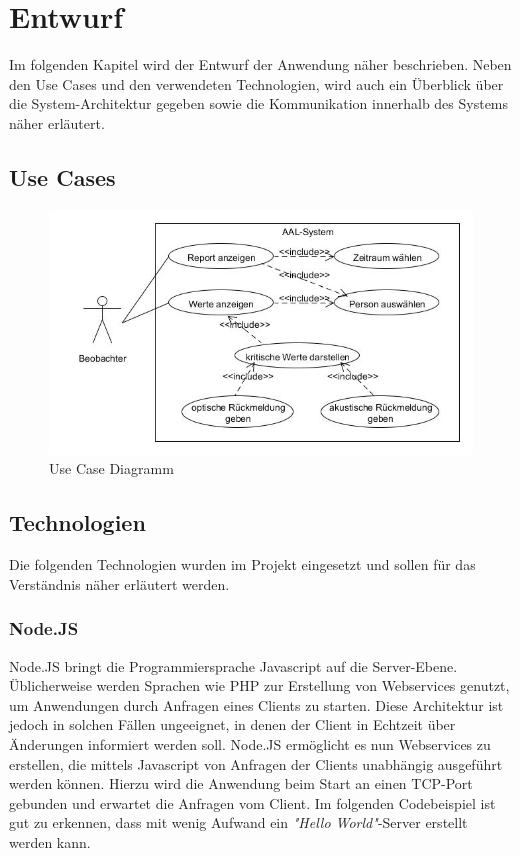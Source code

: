 \section{Entwurf}
\label{sec:Entwurf}
Im folgenden Kapitel wird der Entwurf der Anwendung näher beschrieben. Neben den Use Cases und den verwendeten Technologien, wird auch ein Überblick über die System-Architektur gegeben sowie die Kommunikation innerhalb des Systems näher erläutert.

\subsection{Use Cases}
\label{subsec:UseCases}
\begin{figure}[h]
\begin{center}
\includegraphics[scale=0.7]{images/AAL-Use-Case-Diagramm.jpg} 
\caption{Use Case Diagramm}
\label{fig:UseCaseDiagramm}
\end{center}
\end{figure}


\subsection{Technologien}
\label{subsec:Technologien}
Die folgenden Technologien wurden im Projekt eingesetzt und sollen für das Verständnis näher erläutert werden.

\subsubsection{Node.JS}
\label{subsec:NodeJS}
Node.JS \cite{nodejswebsite} bringt die Programmiersprache Javascript auf die Server-Ebene. Üblicherweise werden Sprachen wie PHP zur Erstellung von Webservices genutzt, um Anwendungen durch Anfragen eines Clients zu starten. Diese Architektur ist jedoch in solchen Fällen ungeeignet, in denen der Client in Echtzeit über Änderungen informiert werden soll. Node.JS ermöglicht es nun Webservices zu erstellen, die mittels Javascript von Anfragen der Clients unabhängig ausgeführt werden können. Hierzu wird die Anwendung beim Start an einen TCP-Port gebunden und erwartet die Anfragen vom Client. Im folgenden Codebeispiel ist gut zu erkennen, dass mit wenig Aufwand ein \textit{"Hello World"}-Server erstellt werden kann.

